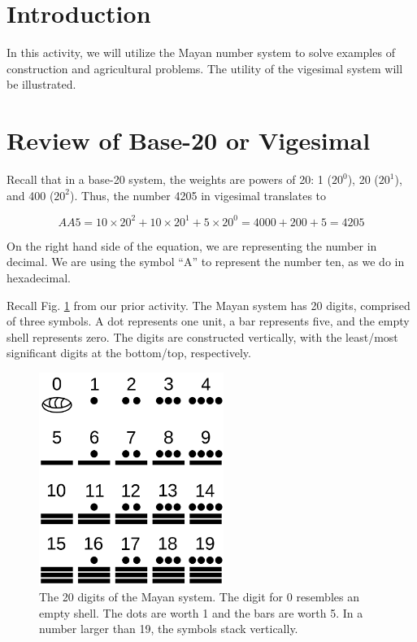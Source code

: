 \documentclass[12pt]{article}
\begin{document}
\maketitle

\section{Introduction}

In this activity, we will utilize the Mayan number system to solve examples of construction and agricultural problems.  The utility of the vigesimal system will be illustrated.

\section{Review of Base-20 or Vigesimal}

Recall that in a base-20 system, the weights are powers of 20: 1 ($20^0$), 20 ($20^1$), and 400 ($20^2$). Thus, the number 4205 in vigesimal translates to

\begin{equation}
AA5 = 10 \times 20^2 + 10 \times 20^1 + 5\times 20^0 = 4000 + 200 + 5 = 4205
\end{equation}

On the right hand side of the equation, we are representing the number in decimal.  We are using the symbol ``A'' to represent the number ten, as we do in hexadecimal.

Recall Fig. \ref{fig:maya} from our prior activity.  The Mayan system has 20 digits, comprised of three symbols.  A dot represents one unit, a bar represents five, and the empty shell represents zero.  The digits are constructed vertically, with the least/most significant digits at the bottom/top, respectively.

\begin{figure}[hb]
\centering
\includegraphics[width=6cm]{figures/maya_digits.png}
\caption{\label{fig:maya} The 20 digits of the Mayan system.  The digit for 0 resembles an empty shell.  The dots are worth 1 and the bars are worth 5.  In a number larger than 19, the symbols stack vertically.}
\end{figure}
\end{document}
